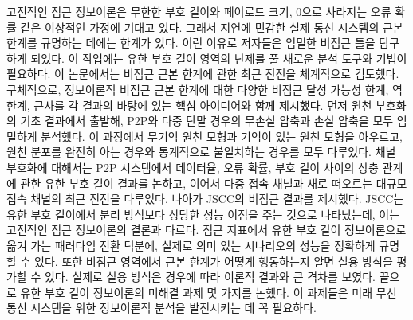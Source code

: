 고전적인 점근 정보이론은 무한한 부호 길이와 페이로드 크기, 0으로 사라지는 오류 확률 같은 이상적인 가정에 기대고 있다. 그래서 지연에 민감한 실제 통신 시스템의 근본 한계를 규명하는 데에는 한계가 있다. 이런 이유로 저자들은 엄밀한 비점근 틀을 탐구하게 되었다. 이 작업에는 유한 부호 길이 영역의 난제를 풀 새로운 분석 도구와 기법이 필요하다. 이 논문에서는 비점근 근본 한계에 관한 최근 진전을 체계적으로 검토했다. 구체적으로, 정보이론적 비점근 근본 한계에 대한 다양한 비점근 달성 가능성 한계, 역 한계, 근사를 각 결과의 바탕에 있는 핵심 아이디어와 함께 제시했다. 먼저 원천 부호화의 기초 결과에서 출발해, P2P와 다중 단말 경우의 무손실 압축과 손실 압축을 모두 엄밀하게 분석했다. 이 과정에서 무기억 원천 모형과 기억이 있는 원천 모형을 아우르고, 원천 분포를 완전히 아는 경우와 통계적으로 불일치하는 경우를 모두 다루었다. 채널 부호화에 대해서는 P2P 시스템에서 데이터율, 오류 확률, 부호 길이 사이의 상충 관계에 관한 유한 부호 길이 결과를 논하고, 이어서 다중 접속 채널과 새로 떠오르는 대규모 접속 채널의 최근 진전을 다루었다. 나아가 JSCC의 비점근 결과를 제시했다. JSCC는 유한 부호 길이에서 분리 방식보다 상당한 성능 이점을 주는 것으로 나타났는데, 이는 고전적인 점근 정보이론의 결론과 다르다. 점근 지표에서 유한 부호 길이 정보이론으로 옮겨 가는 패러다임 전환 덕분에, 실제로 의미 있는 시나리오의 성능을 정확하게 규명할 수 있다. 또한 비점근 영역에서 근본 한계가 어떻게 행동하는지 알면 실용 방식을 평가할 수 있다. 실제로 실용 방식은 경우에 따라 이론적 결과와 큰 격차를 보였다. 끝으로 유한 부호 길이 정보이론의 미해결 과제 몇 가지를 논했다. 이 과제들은 미래 무선 통신 시스템을 위한 정보이론적 분석을 발전시키는 데 꼭 필요하다.
